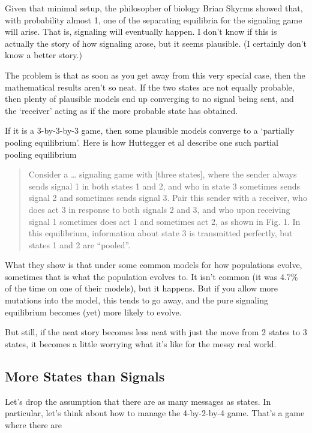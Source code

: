 \documentclass[
  11pt,
]{article}
\begin{document}
Given that minimal setup, the philosopher of biology Brian Skyrms showed
that, with probability almost 1, one of the separating equilibria for
the signaling game will arise. That is, signaling will eventually
happen. I don't know if this is actually the story of how signaling
arose, but it seems plausible. (I certainly don't know a better story.)

The problem is that as soon as you get away from this very special case,
then the mathematical results aren't so neat. If the two states are not
equally probable, then plenty of plausible models end up converging to
no signal being sent, and the `receiver' acting as if the more probable
state has obtained.

If it is a 3-by-3-by-3 game, then some plausible models converge to a
`partially pooling equilibrium'. Here is how Huttegger et al describe
one such partial pooling equilibrium

\begin{quote}
Consider a \ldots{} signaling game with {[}three states{]}, where the
sender always sends signal 1 in both states 1 and 2, and who in state 3
sometimes sends signal 2 and sometimes sends signal 3. Pair this sender
with a receiver, who does act 3 in response to both signals 2 and 3, and
who upon receiving signal 1 sometimes does act 1 and sometimes act 2, as
shown in Fig. 1. In this equilibrium, information about state 3 is
transmitted perfectly, but states 1 and 2 are ``pooled''.
\end{quote}

What they show is that under some common models for how populations
evolve, sometimes that is what the population evolves to. It isn't
common (it was 4.7\% of the time on one of their models), but it
happens. But if you allow more mutations into the model, this tends to
go away, and the pure signaling equilibrium becomes (yet) more likely to
evolve.

But still, if the neat story becomes less neat with just the move from 2
states to 3 states, it becomes a little worrying what it's like for the
messy real world.

\hypertarget{more-states-than-signals}{%
\subsection{More States than Signals}\label{more-states-than-signals}}

Let's drop the assumption that there are as many messages as states. In
particular, let's think about how to manage the 4-by-2-by-4 game. That's
a game where there are
\end{document}
